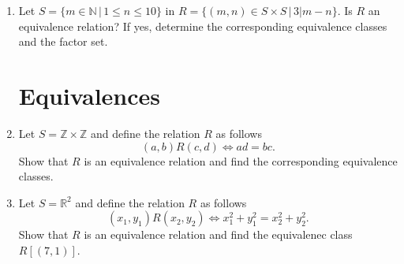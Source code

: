\documentclass[11pt,paper=b5,footinclude,headinclude]{scrbook} %
\theoremstyle{remark}
\theoremstyle{definition} %
\theoremstyle{theorem} %
\begin{document}
\begin{enumerate}
\item Let $S= \{m\in \mathbb{N}\,|\, 1\leq n \leq 10\}$ in $R=\{(m,n)\in S\times S\,|\, 3|m-n\}$.
Is $R$ an equivalence relation? If yes, determine the corresponding equivalence classes and the factor set.

\section{Equivalences}
\item Let $S = \mathbb{Z}\times \mathbb{Z}$ and define the relation $R$ as follows
$$(a,b)R(c,d)\Leftrightarrow ad = bc.$$
Show that $R$ is an equivalence relation  and find the corresponding equivalence classes.

\item Let  $S =  \mathbb{R}^2$ and define the relation $R$ as follows
$$(x_1,y_1)R(x_2,y_2)\Leftrightarrow x_1^2 + y_1^2 = x_2^2 + y_2^2.$$
Show that $R$ is an equivalence relation  and find the equivalenec class $R[(7,1)]$.



\end{enumerate}
\end{document}
